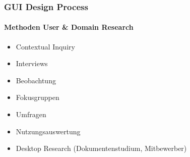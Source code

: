 \documentclass{article}
\begin{document}
\subsubsection{GUI Design Process}
\paragraph{Methoden User \& Domain Research}
\begin{itemize}
	\item Contextual Inquiry
	\item Interviews
	\item Beobachtung
	\item Fokusgruppen
	\item Umfragen
	\item Nutzungsauswertung
	\item Desktop Research (Dokumentenstudium, Mitbewerber)
\end{itemize}
\end{document}
